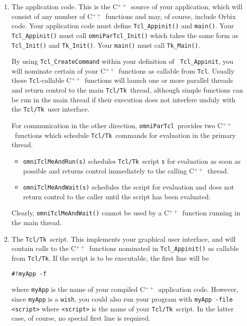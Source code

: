 \documentclass[11pt]{article}
\def\omniParTcl{{\tt omniParTcl}}
\def\tcltk{{\tt Tcl/Tk}}
\def\tcl{{\tt Tcl}}
\def\CXX{\relax C$^{++}$\relax}
\begin{document}
\begin{enumerate}

\item The application code.  This is the \CXX\ source of your
application, which will consist of any number of \CXX\ functions and
may, of course, include Orbix code.  Your application code must define
{\tt Tcl\_Appinit()} and {\tt main()}.  Your {\tt Tcl\_Appinit()} must
call {\tt omniParTcl\_Init()} which takes the same form as {\tt
Tcl\_Init()} and {\tt Tk\_Init()}.  Your {\tt main()} must call
{\tt Tk\_Main()}.

By using {\tt Tcl\_CreateCommand} within your definition of {\tt
Tcl\_Appinit}, you will nominate certain of your \CXX\ functions as
callable from \tcl.  Usually these \tcl-callable \CXX\ functions will
launch one or more parallel threads and return control to the main
\tcltk\ thread, although simple functions can be run in the main thread
if their execution does not interfere unduly with the \tcltk\ user
interface.

For communication in the other direction, \omniParTcl\ provides two
\CXX\ functions which schedule \tcltk\ commands for evaluation in the
primary thread.  

\begin{itemize}
\item
{\tt omniTclMeAndRun(s)} schedules \tcltk\ script {\tt s}
for evaluation as soon as possible and returns control
immediately to the calling \CXX\ thread.  
\item
{\tt omniTclMeAndWait(s)}
schedules the script for evaluation and does not return control to the
caller until the script has been evaluated.  
\end{itemize}

\noindent
Clearly, {\tt omniTclMeAndWait()} cannot be used by a
\CXX\ function running in the main thread.

\item

The \tcltk\ script.  This implements your graphical user interface, and
will contain calls to the \CXX\ functions nominated in {\tt Tcl\_Appinit()}
as callable from \tcltk.  If the script is to be executable, the first 
line will be

\bigskip
\verb|#!myApp -f|
\bigskip

\noindent
where {\tt myApp} is the name of your compiled \CXX\ application code.
However, since {\tt myApp} is a {\tt wish}, you could also run your
program with {\tt myApp -file <script>} where {\tt <script>} is the name
of your \tcltk\ script.  In the latter case, of course, no special first line
is required.

\end{enumerate}
\end{document}
